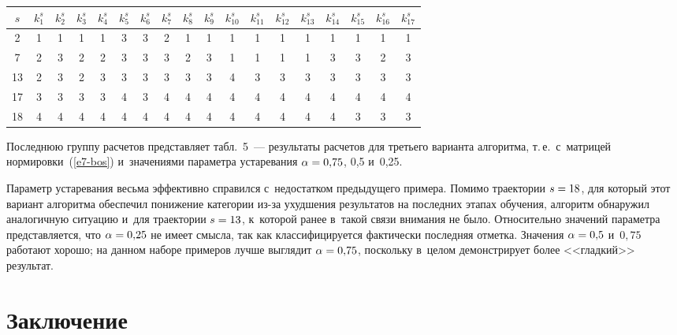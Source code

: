 \begin{multicols}{2}
 \begin{table*}\small %
     \begin{center}
      \vspace*{2ex}
      
      \begin{tabular}{|c|c|c|c|c|c|c|c|c|c|c|c|c|c|c|c|c|c|}
      \hline
$s$&$k_1^s$&$k_2^s$&$k_3^s$&$k_4^s$&$k_5^s$&$k_6^s$&$k_7^s$&$k_8^s$&$k_9^s$&$k^s_{10}
$&$k^s_{11}$&$k^s_{12}$&$k^s_{13}$&$k^s_{14}$&$k^s_{15}$&$k^s_{16}$&$k_{17}^s$\\
\hline
\hphantom{9}2&1&1&1&1&3&3&2&1&1&1&1&1&1&1&1&1&1\\
\hphantom{9}7&2&3&2&2&3&3&3&2&3&1&1&1&1&3&3&2&3\\
13&2&3&2&3&3&3&3&3&3&4&3&3&3&3&3&3&3\\
17&3&3&3&3&4&3&4&4&4&4&4&4&4&4&4&4&4\\
18&4&4&4&4&4&4&4&4&4&4&4&4&4&4&3&3&3\\
\hline
\end{tabular}
\end{center}
\end{table*}
     
     Последнюю группу расчетов представляет табл.~5~--- результаты 
расчетов для третьего варианта алгоритма, т.\,е.\ с~матрицей 
нормировки~(\ref{e7-bos}) и~значениями параметра устаревания 
$\alpha\hm=0{,}75$, 0,5 и~0,25.  

    
                                   
     
     Параметр устаревания весьма эффективно справился с~недостатком 
предыдущего примера. Помимо траектории $s\hm=18$, для который этот 
вариант алгоритма обеспечил понижение категории из-за ухудшения 
результатов на последних этапах обучения, алгоритм обнаружил 
аналогичную ситуацию и~для траектории $s\hm=13$, к~которой ранее в~такой 
связи внимания не было. Относительно значений параметра представляется, 
что $\alpha\hm= 0{,}25$ не имеет смысла, так как классифицируется 
фактически последняя отметка. Значения $\alpha\hm= 0{,}5$ 
и~$0{,}75$ работают хорошо; на данном наборе примеров лучше 
выглядит $\alpha\hm=0{,}75$, поскольку в~целом демонстрирует более 
<<гладкий>> результат. 

\vspace*{-6pt}

\section{Заключение}


\end{multicols}
